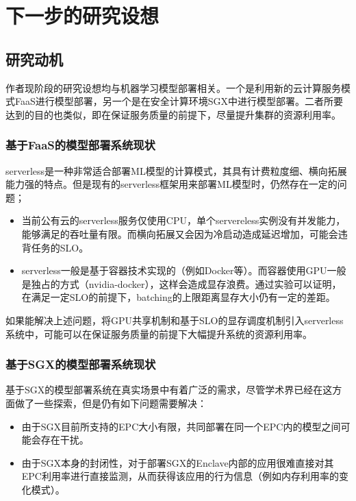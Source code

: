 \chapter{下一步的研究设想}

\section{研究动机}

作者现阶段的研究设想均与机器学习模型部署相关。一个是利用新的云计算服务模式FaaS进行模型部署，另一个是在安全计算环境SGX中进行模型部署。二者所要达到的目的也类似，即在保证服务质量的前提下，尽量提升集群的资源利用率。

\subsection{基于FaaS的模型部署系统现状}
serverless是一种非常适合部署ML模型的计算模式，其具有计费粒度细、横向拓展能力强的特点。但是现有的serverless框架用来部署ML模型时，仍然存在一定的问题；
\begin{itemize}
    \item 当前公有云的serverless服务仅使用CPU，单个servereless实例没有并发能力，能够满足的吞吐量有限。而横向拓展又会因为冷启动造成延迟增加，可能会违背任务的SLO。
    \item serverless一般是基于容器技术实现的（例如Docker等）。而容器使用GPU一般是独占的方式（nvidia-docker），这样会造成显存浪费。通过实验可以证明，在满足一定SLO的前提下，batching的上限距离显存大小仍有一定的差距。
\end{itemize}

如果能解决上述问题，将GPU共享机制和基于SLO的显存调度机制引入serverless系统中，可能可以在保证服务质量的前提下大幅提升系统的资源利用率。

\subsection{基于SGX的模型部署系统现状}
基于SGX的模型部署系统在真实场景中有着广泛的需求，尽管学术界已经在这方面做了一些探索，但是仍有如下问题需要解决：
\begin{itemize}
    \item 由于SGX目前所支持的EPC大小有限，共同部署在同一个EPC内的模型之间可能会存在干扰。
    \item 由于SGX本身的封闭性，对于部署SGX的Enclave内部的应用很难直接对其EPC利用率进行直接监测，从而获得该应用的行为信息（例如内存利用率的变化模式）。
\end{itemize}

